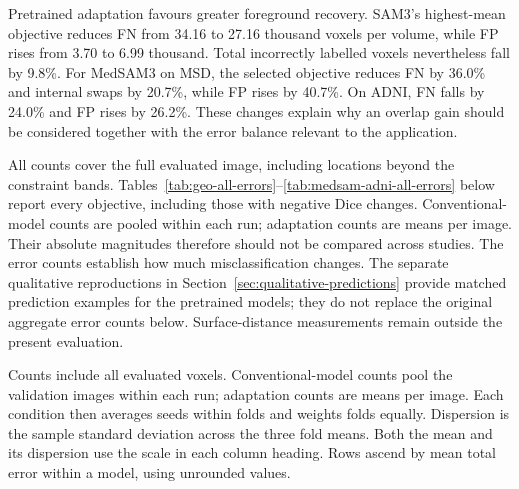 \documentclass[12pt,a4paper]{article}
\begin{document}
Pretrained adaptation favours greater foreground recovery. SAM3's
highest-mean objective reduces FN from 34.16 to 27.16 thousand voxels
per volume, while FP rises from 3.70 to 6.99 thousand. Total incorrectly
labelled voxels nevertheless fall by 9.8\%. For MedSAM3 on MSD, the
selected objective reduces FN by 36.0\% and internal swaps by 20.7\%,
while FP rises by 40.7\%. On ADNI, FN falls by 24.0\% and FP rises
by 26.2\%. These changes explain why an overlap gain should be considered
together with the error balance relevant to the application.

All counts cover the full evaluated image, including locations beyond
the constraint bands. Tables~\ref{tab:geo-all-errors}--\ref{tab:medsam-adni-all-errors}
below report every objective, including
those with negative Dice changes. Conventional-model counts are pooled
within each run; adaptation counts are means per image. Their absolute
magnitudes therefore should not be compared across studies. The error
counts establish how much misclassification changes. The separate
qualitative reproductions in Section~\ref{sec:qualitative-predictions}
provide matched prediction examples for the pretrained models; they do
not replace the original aggregate error counts below. Surface-distance
measurements remain outside the present evaluation.

\FloatBarrier

Counts include all evaluated voxels. Conventional-model counts pool the
validation images within each run; adaptation counts are means per image.
Each condition then averages seeds within folds and weights folds equally.
Dispersion is the sample standard deviation across the three fold means.
Both the mean and its dispersion use the scale in each column heading.
Rows ascend by mean total error within a model, using unrounded values.
\end{document}
